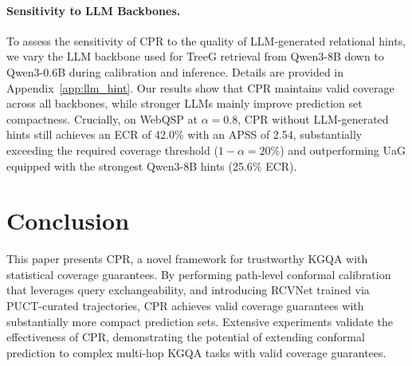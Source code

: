 \documentclass{article}
\theoremstyle{plain}
\theoremstyle{definition}
\theoremstyle{remark}
\begin{document}

\paragraph{Sensitivity to LLM Backbones.}
To assess the sensitivity of CPR to the quality of LLM-generated relational hints, we vary the LLM backbone used for TreeG retrieval from Qwen3-8B down to Qwen3-0.6B during calibration and inference. Details are provided in Appendix~\ref{app:llm_hint}. 
Our results show that CPR maintains valid coverage across all backbones, while stronger LLMs mainly improve prediction set compactness. Crucially, on WebQSP at $\alpha = 0.8$, CPR without LLM-generated hints still achieves an ECR of 42.0\% with an APSS of 2.54, substantially exceeding the required coverage threshold ($1 - \alpha = 20\%$) and outperforming UaG equipped with the strongest Qwen3-8B hints (25.6\% ECR).


\section{Conclusion}
This paper presents CPR, a novel framework for trustworthy KGQA with statistical coverage guarantees. By performing path-level conformal calibration that leverages query exchangeability, and introducing RCVNet trained via PUCT-curated trajectories, CPR achieves valid coverage guarantees with substantially more compact prediction sets. Extensive experiments validate the effectiveness of CPR, demonstrating the potential of extending conformal prediction to complex multi-hop KGQA tasks with valid coverage guarantees.
\end{document}
